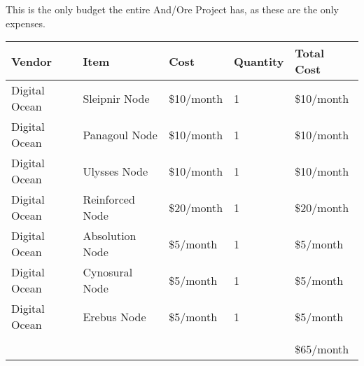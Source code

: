 \documentclass[11pt]{article}
\begin{document}
This is the only budget the entire And/Ore Project has, as these are the only expenses.

\begin{center}
    \begin{tabular}{ | l | l | l | l | l |}
    \hline
    Vendor & Item & Cost & Quantity & Total Cost\\ \hline
    Digital Ocean & Sleipnir Node & \$10/month & 1 & \$10/month \\ \hline
    Digital Ocean & Panagoul Node & \$10/month & 1 & \$10/month \\ \hline
    Digital Ocean & Ulysses Node & \$10/month & 1 & \$10/month \\ \hline
    Digital Ocean & Reinforced Node & \$20/month & 1 & \$20/month \\ \hline
    Digital Ocean & Absolution Node & \$5/month & 1 & \$5/month \\ \hline
    Digital Ocean & Cynosural Node & \$5/month & 1 & \$5/month \\ \hline
    Digital Ocean & Erebus Node & \$5/month & 1 & \$5/month \\ \hline
    \space & \space & \space & \space & \space \\ \hline
    \space & \space & \space & \space & \$65/month \\ \hline
    \hline
    \end{tabular}
\end{center}
\end{document}
